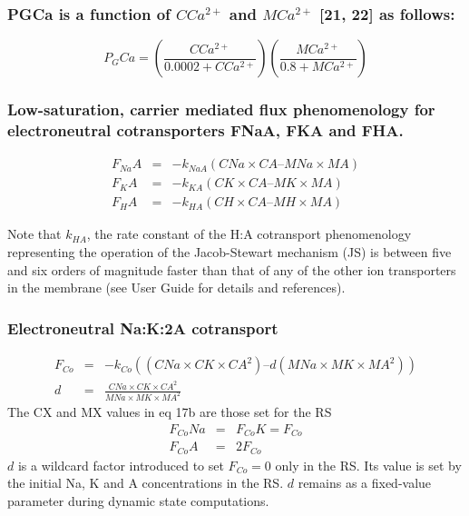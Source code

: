 \documentclass[a4paper]{article}
\newcommand{\med}[1]{M#1}
\newcommand{\cell}[1]{C#1}
\newcommand{\MA}{\med{A}}
\newcommand{\MNa}{\med{Na}}
\newcommand{\MK}{\med{K}}
\newcommand{\MCatp}{\med{Ca^{2+}}}
\newcommand{\MH}{\med{H}}
\newcommand{\CNa}{\cell{Na}}
\newcommand{\CK}{\cell{K}}
\newcommand{\CH}{\cell{H}}
\newcommand{\CCatp}{\cell{Ca^{2+}}}
\newcommand{\CA}{\cell{A}}
\newcommand{\F}[2]{F_{#1}#2}
\newcommand{\kk}[2]{k_{#1}#2}
\begin{document}
\subsubsection{PGCa is a function of $CCa^{2+}$ and $MCa^{2+}$ [21, 22] as follows:}
\begin{equation}
P_{G}Ca = \left(\frac{\CCatp}{0.0002 + \CCatp}\right)\left(\frac{\MCatp}{0.8 + \MCatp}\right)
\end{equation}

\subsubsection{Low-saturation, carrier mediated flux phenomenology for electroneutral cotransporters FNaA, FKA and FHA.}

\setcounter{equation}{0}
\renewcommand{\theequation}{16.\alph{equation}}
\begin{eqnarray}
\F{Na}{A} &=& - \kk{NaA}{}(\CNa\times\CA – \MNa\times\MA) \\
\F{K}{A} &=& - \kk{KA}{}(\CK\times\CA – \MK\times\MA) \\
\F{H}{A} &=& - \kk{HA}{}(\CH\times\CA – \MH\times\MA) 
\end{eqnarray}

Note that $\kk{HA}{}$, the rate constant of the H:A cotransport phenomenology representing the operation of the Jacob-Stewart mechanism (JS) is between five and six orders of magnitude faster than that of any of the other ion transporters in the membrane (see User Guide for details and references).  

\setcounter{equation}{0}
\renewcommand{\theequation}{17.\alph{equation}}

\subsubsection{Electroneutral Na:K:2A cotransport}

\begin{eqnarray}
\F{Co}{} &=& -\kk{Co}{}((CNa\times\CK\times\CA^2) – d(MNa\times\MK\times\MA^2)) \\
d &=& \frac{\CNa\times\CK\times\CA^2}{\MNa\times\MK\times\MA^2}
\end{eqnarray}
The CX and MX values in eq 17b are those set for the RS 
\begin{eqnarray}
\F{Co}{Na} &=& \F{Co}{K} = \F{Co}{}\\
\F{Co}{A} &=& 2\F{Co}{}
\end{eqnarray}
$d$ is a wildcard factor introduced to set $\F{Co}{} = 0$ only in the RS. Its value is set by the initial Na, K and A concentrations in the RS. $d$ remains as a fixed-value parameter during dynamic state computations.    
\end{document}
